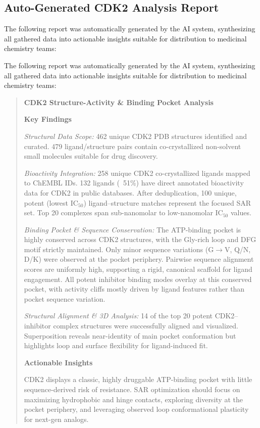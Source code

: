 \documentclass{article}
\begin{document}
\newpage
\subsection{Auto-Generated CDK2 Analysis Report}\label{sec:appendix_cdk2_report}
The following report was automatically generated by the AI system, synthesizing all gathered data into actionable insights suitable for distribution to medicinal chemistry teams:

The following report was automatically generated by the AI system, synthesizing all gathered data into actionable insights suitable for distribution to medicinal chemistry teams:

\begin{quote}
\textbf{CDK2 Structure-Activity \& Binding Pocket Analysis}

\textbf{Key Findings}

\emph{Structural Data Scope:} 462 unique CDK2 PDB structures identified and curated. 479 ligand/structure pairs contain co-crystallized non-solvent small molecules suitable for drug discovery.

\emph{Bioactivity Integration:} 258 unique CDK2 co-crystallized ligands mapped to ChEMBL IDs. 132 ligands (~51\%) have direct annotated bioactivity data for CDK2 in public databases. After deduplication, 100 unique, potent (lowest IC$_{50}$) ligand–structure matches represent the focused SAR set. Top 20 complexes span sub-nanomolar to low-nanomolar IC$_{50}$ values.

\emph{Binding Pocket \& Sequence Conservation:} The ATP-binding pocket is highly conserved across CDK2 structures, with the Gly-rich loop and DFG motif strictly maintained. Only minor sequence variations (G$\rightarrow$V, Q/N, D/K) were observed at the pocket periphery. Pairwise sequence alignment scores are uniformly high, supporting a rigid, canonical scaffold for ligand engagement. All potent inhibitor binding modes overlay at this conserved pocket, with activity cliffs mostly driven by ligand features rather than pocket sequence variation.

\emph{Structural Alignment \& 3D Analysis:} 14 of the top 20 potent CDK2–inhibitor complex structures were successfully aligned and visualized. Superposition reveals near-identity of main pocket conformation but highlights loop and surface flexibility for ligand-induced fit.

\textbf{Actionable Insights}

CDK2 displays a classic, highly druggable ATP-binding pocket with little sequence-derived risk of resistance. SAR optimization should focus on maximizing hydrophobic and hinge contacts, exploring diversity at the pocket periphery, and leveraging observed loop conformational plasticity for next-gen analogs.


\end{quote}
\end{document}
